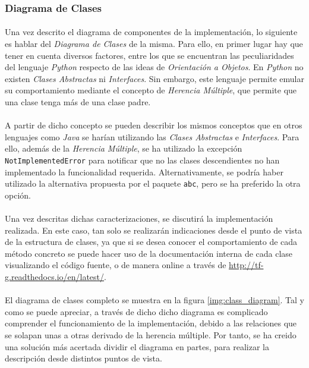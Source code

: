 \documentclass{subfiles}
\begin{document}
        \subsubsection{Diagrama de Clases}
        \label{sec:class_diagram}

          \paragraph{}
          Una vez descrito el diagrama de componentes de la implementación, lo siguiente es hablar del \emph{Diagrama de Clases} de la misma. Para ello, en primer lugar hay que tener en cuenta diversos factores, entre los que se encuentran las peculiaridades del lenguaje \emph{Python} respecto de las ideas de \emph{Orientación a Objetos}. En \emph{Python} no existen \emph{Clases Abstractas} ni \emph{Interfaces}. Sin embargo, este lenguaje permite emular su comportamiento mediante el concepto de \emph{Herencia Múltiple}, que permite que una clase tenga más de una clase padre.

          \paragraph{}
          A partir de dicho concepto se pueden describir los mismos conceptos que en otros lenguajes como \emph{Java} se harían utilizando las \emph{Clases Abstractas} e \emph{Interfaces}. Para ello, además de la \emph{Herencia Múltiple}, se ha utilizado la excepción \texttt{NotImplementedError} para notificar que no las clases descendientes no han implementado la funcionalidad requerida. Alternativamente, se podría haber utilizado la alternativa propuesta por el paquete \texttt{abc}, pero se ha preferido la otra opción.

          \paragraph{}
          Una vez descritas dichas caracterizaciones, se discutirá la implementación realizada. En este caso, tan solo se realizarán indicaciones desde el punto de vista de la estructura de clases, ya que si se desea conocer el comportamiento de cada método concreto se puede hacer uso de la documentación interna de cada clase visualizando el código fuente, o de manera online a través de \url{http://tf-g.readthedocs.io/en/latest/}.

          \paragraph{}
          El diagrama de clases completo se muestra en la figura \ref{img:class_diagram}. Tal y como se puede apreciar, a través de dicho dicho diagrama es complicado comprender el funcionamiento de la implementación, debido a las relaciones que se solapan unas a otras derivado de la herencia múltiple. Por tanto, se ha creido una solución más acertada dividir el diagrama en partes, para realizar la descripción desde distintos puntos de vista.
\end{document}

